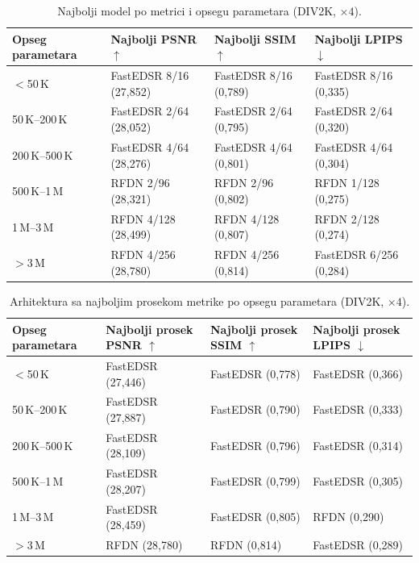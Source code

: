 
\begin{table}[H]
    \centering
    \caption{Najbolji model po metrici i opsegu parametara (DIV2K, $\times4$).}
    \label{tab:param_bins_best_model_4x_DIV2K}
    \small
    \setlength{\tabcolsep}{4pt}
    \begin{tabular}{@{}llll@{}}
        \toprule
        Opseg parametara & Najbolji PSNR $\uparrow$ & Najbolji SSIM $\uparrow$ & Najbolji LPIPS $\downarrow$ \\
        \midrule
        $<$50\,K & FastEDSR 8/16 (27,852) & FastEDSR 8/16 (0,789) & FastEDSR 8/16 (0,335) \\
        50\,K--200\,K & FastEDSR 2/64 (28,052) & FastEDSR 2/64 (0,795) & FastEDSR 2/64 (0,320) \\
        200\,K--500\,K & FastEDSR 4/64 (28,276) & FastEDSR 4/64 (0,801) & FastEDSR 4/64 (0,304) \\
        500\,K--1\,M & RFDN 2/96 (28,321) & RFDN 2/96 (0,802) & RFDN 1/128 (0,275) \\
        1\,M--3\,M & RFDN 4/128 (28,499) & RFDN 4/128 (0,807) & RFDN 2/128 (0,274) \\
        $>$3\,M & RFDN 4/256 (28,780) & RFDN 4/256 (0,814) & FastEDSR 6/256 (0,284) \\
        \bottomrule
    \end{tabular}
\end{table}

\begin{table}[H]
    \centering
    \caption{Arhitektura sa najboljim prosekom metrike po opsegu parametara (DIV2K, $\times4$).}
    \label{tab:param_bins_best_arch_4x_DIV2K}
    \small
    \setlength{\tabcolsep}{4pt}
    \begin{tabular}{@{}llll@{}}
        \toprule
        Opseg parametara & Najbolji prosek PSNR $\uparrow$ & Najbolji prosek SSIM $\uparrow$ & Najbolji prosek LPIPS $\downarrow$ \\
        \midrule
        $<$50\,K & FastEDSR (27,446) & FastEDSR (0,778) & FastEDSR (0,366) \\
        50\,K--200\,K & FastEDSR (27,887) & FastEDSR (0,790) & FastEDSR (0,333) \\
        200\,K--500\,K & FastEDSR (28,109) & FastEDSR (0,796) & FastEDSR (0,314) \\
        500\,K--1\,M & FastEDSR (28,207) & FastEDSR (0,799) & FastEDSR (0,305) \\
        1\,M--3\,M & FastEDSR (28,459) & FastEDSR (0,805) & RFDN (0,290) \\
        $>$3\,M & RFDN (28,780) & RFDN (0,814) & FastEDSR (0,289) \\
        \bottomrule
    \end{tabular}
\end{table}
